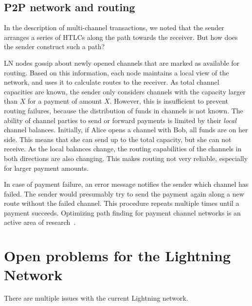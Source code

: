 \subsection{P2P network and routing}

In the description of multi-channel transactions, we noted that the sender arranges a series of HTLCs along the path towards the receiver.
But how does the sender construct such a path?

LN nodes gossip about newly opened channels that are marked as available for routing.
Based on this information, each node maintains a local view of the network, and uses it to calculate routes to the receiver.
As total channel capacities are known, the sender only considers channels with the capacity larger than $X$ for a payment of amount $X$.
However, this is insufficient to prevent routing failures, because the distribution of funds in channels is not known.
The ability of channel parties to send or forward payments is limited by their \textit{local} channel balances.
Initially, if Alice opens a channel with Bob, all funds are on her side.
This means that she can send up to the total capacity, but she can not receive.
As the local balances change, the routing capabilities of the channels in both directions are also changing.
This makes routing not very reliable, especially for larger payment amounts.

In case of payment failure, an error message notifies the sender which channel has failed.
The sender would presumably try to send the payment again along a new route without the failed channel.
This procedure repeats multiple times until a payment succeeds.
Optimizing path finding for payment channel networks is an active area of research~\cite{Pickhardt2019a, Prihodko2016, Grunspan2018, Pickhardt2019, Piatkivskyi2018, Sivaraman2018, Bagaria2019, Roos2018}.


\section{Open problems for the Lightning Network}




There are multiple issues with the current Lightning network.

